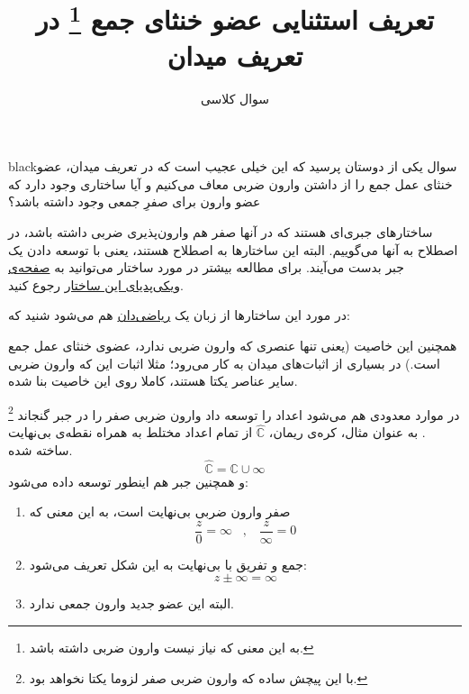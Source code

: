 \documentclass[a4paper, 12pt]{article}
\title{\textbf{
تعریف استثنایی عضو خنثای‌ جمع
\footnote{به این معنی که نیاز نیست وارون ضربی داشته باشد.}
 در تعریف میدان
}}
\author{سوال کلاسی}
\date{}
\begin{document}
\maketitle
\begin{boxes}{black}{سوال}
یکی از دوستان پرسید که این خیلی عجیب است که در تعریف میدان، عضو خنثای عمل جمع را از داشتن وارون ضربی معاف می‌کنیم و آیا ساختاری وجود دارد که عضو وارون برای صفرِ جمعی وجود داشته باشد؟
\end{boxes}
\vspace{1em}
ساختارهای جبری‌ای هستند که در آنها صفر هم وارون‌پذیری ضربی داشته باشد، در اصطلاح به آنها 
می‌گوییم. البته این ساختارها به اصطلاح 
هستند، یعنی با توسعه‌ دادن یک جبر بدست می‌آیند. برای مطالعه بیشتر در مورد ساختار می‌توانید به 
\href{https://en.wikipedia.org/wiki/Wheel_theory}{صفحه‌ی ویکی‌پدیای این ساختار}
رجوع کنید.

در مورد این ساختارها از زبان یک 
\href{https://www.quora.com/Can-there-be-a-field-where-every-element-has-a-multiplicative-inverse-even-the-additive-identity-0-Are-there-fields-where-the-roles-are-switched-instead-of-zero-having-no-multiplicative-inverse-one-has-no-additive#:~:text=Almost%20all%20real%20numbers%20have,only%20one%20that%20does%20not.&text=For%20the%20number%20zero%2C%20there,produce%20a%20product%20of%20one.}{ریاضی‌دان}
 هم می‌شود شنید که:
\begin{LTR}
\begin{quote}
\end{quote}
\end{LTR}

همچنین این خاصیت (یعنی تنها عنصری که وارون ضربی ندارد، عضوی خنثای عمل جمع است.) در بسیاری از اثبات‌های میدان به کار می‌رود؛ مثلا اثبات این که وارون ضربی سایر عناصر یکتا هستند، کاملا روی این خاصیت بنا شده.


\vspace{2em}
در موارد معدودی هم می‌شود اعداد را توسعه داد وارون ضربی صفر را در جبر گنجاند
\footnote{با این پیچش ساده که وارون ضربی صفر لزوما یکتا نخواهد بود.}
. به عنوان مثال، کره‌ی ریمان، 
$\hat{\mathbb{C}}$
از تمام اعداد مختلط به همراه نقطه‌ی بی‌نهایت ساخته شده.
\[
\hat{\mathbb{C}} = \mathbb{C} \cup {\infty}
\]
و همچنین جبر هم اینطور توسعه داده می‌شود:
\begin{enumerate}
	\item صفر وارون ضربی بی‌نهایت است، به این معنی که 
	\[
	\frac{z}{0} = \infty \;\;\; , \;\;\; \frac{z}{\infty} = 0
	\]
	\item جمع و تفریق با بی‌نهایت به این شکل تعریف می‌شود:
	 \[
	 z\pm \infty = \infty
	 \]
	\item البته این عضو جدید وارون جمعی ندارد.
\end{enumerate}
\end{document}
